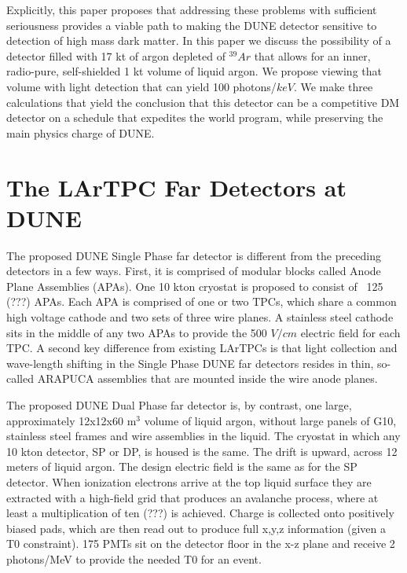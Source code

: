 \documentclass[a4paper,11pt]{article}
\begin{document}
Explicitly, this paper proposes that  addressing these problems with sufficient seriousness provides a viable path to making the DUNE detector sensitive to detection of high mass dark matter. In this paper we discuss the possibility of a detector filled with 17 kt of argon depleted of $^{39}Ar$ that allows for an inner, radio-pure, self-shielded 1 kt volume of liquid argon.  We propose viewing that volume with light detection that can yield 100 photons/$keV$. We make three calculations that yield the conclusion that this detector can be a competitive DM detector on a schedule that expedites the world program, while preserving the main physics charge of DUNE.


\section {The LArTPC Far Detectors at DUNE}

The proposed DUNE Single Phase far detector is different from the preceding detectors in a few ways. First, it is comprised of modular blocks called Anode Plane Assemblies (APAs). One 10 kton cryostat is proposed to consist of ~125 (???) APAs. Each APA is comprised of one or two TPCs, which share a common high voltage cathode and two sets of three wire planes. A stainless steel cathode sits in the middle of any two APAs to provide the 500 $V/cm$ electric field for each TPC. A second key difference from existing LArTPCs is that light collection and wave-length shifting in the Single Phase DUNE far detectors resides in thin, so-called ARAPUCA assemblies that are mounted inside the wire anode planes.

The proposed DUNE Dual Phase far detector is, by contrast, one large, approximately 12x12x60 m$^3$ volume of liquid argon, without large panels of G10, stainless steel frames and wire assemblies in the liquid. The cryostat in which any 10 kton detector, SP or DP, is housed is the same. The drift is upward, across 12 meters of liquid argon. The design electric field is the same as for the SP detector. When ionization electrons arrive at the top liquid surface they are extracted with a high-field grid that produces an avalanche process, where at least a multiplication of ten (???) is achieved. Charge is collected onto positively biased pads, which are then read out to produce full x,y,z information (given a T0 constraint). 175 PMTs sit on the detector floor in the x-z plane and receive 2 photons/MeV to provide the needed T0 for an event.
\end{document}
